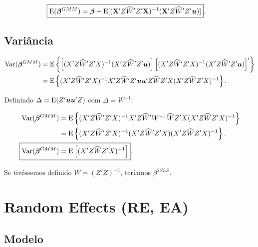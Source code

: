 \documentclass[11pt, oneside, a4paper, article]{article}
\numberwithin{equation}{section}
\begin{document}
\vspace{-1 em}
\begin{align*}
\Aboxed{
\E( \mbs{\beta}^{GMM} ) &=
\mbs{\beta} +
\E[ ( \Xmat' Z \widehat{W}' Z' \Xmat )^{-1} ( \Xmat' Z \widehat{W}' Z' \mbs{u} ) ] }.
\end{align*}

\subsection*{Variância} 

\vspace{-1 em}
\begin{align*}
\text{Var}( \boldsymbol{\beta}^{GMM} ) &=
\text{E} \left\{ 
\left[ ( X' Z \widehat{W}' Z' X )^{-1} ( X' Z \widehat{W}' Z' \boldsymbol{u} ) \right]
\left[ ( X' Z \widehat{W}' Z' X )^{-1} ( X' Z \widehat{W}' Z' \boldsymbol{u} ) \right]'
\right\}
\\ &=
\text{E} \left\{ 
( X' Z \widehat{W}' Z' X )^{-1}
X' Z \widehat{W}' Z' \boldsymbol{u} \boldsymbol{u}' Z \widehat{W} Z' X 
( X' Z \widehat{W} Z' X )^{-1}
\right\}.
\end{align*}

\noindent
Definindo $\Delta = \text{E}(Z' \boldsymbol{u}\boldsymbol{u}' Z)$ com $\Delta = W^{-1}$:

\vspace{-1 em}
\begin{align*}
\Var( \mbs{\beta}^{GMM} ) &=
\E \left\{ 
( X' Z \widehat{W}' Z' X )^{-1}
X' Z \widehat{W}' W^{-1} \widehat{W} Z' X 
( X' Z \widehat{W} Z' X )^{-1}
\right\}
\\ &=
\E \left\{ 
( X' Z \widehat{W}' Z' X )^{-1}
( X' Z \widehat{W}' Z' X )
( X' Z \widehat{W} Z' X )^{-1}
\right\}.
\\
\Aboxed{
\Var( \mbs{\beta}^{GMM} ) &=
\E \left[
( X' Z \widehat{W} Z' X )^{-1}
\right] }.
\end{align*}

\noindent
Se tivéssemos definido $W = (Z'Z)^{-1}$, teríamos $\beta^{2SLS}$.

\clearpage
\section{Random Effects (RE, EA)}


\subsection*{Modelo}
\end{document}
